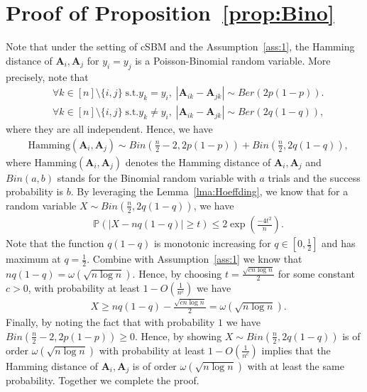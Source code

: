 \documentclass{article} %
\begin{document}
\section{Proof of Proposition~\ref{prop:Bino}}
Note that under the setting of cSBM and the Assumption~\ref{ass:1}, the Hamming distance of $\mathbf{A}_i,\mathbf{A}_j$ for $y_i=y_j$ is a Poisson-Binomial random variable. More precisely, note that
\begin{align}
	& \forall k\in [n]\setminus \{i,j\}\;\text{s.t.}y_k=y_i,\; |\mathbf{A}_{ik}-\mathbf{A}_{jk}| \sim Ber(2p(1-p)).\\
	&  \forall k\in [n]\setminus \{i,j\}\;\text{s.t.}y_k\neq y_i,\; |\mathbf{A}_{ik}-\mathbf{A}_{jk}| \sim Ber(2q(1-q)),
\end{align}
where they are all independent. Hence, we have
\begin{align}
	& \text{Hamming}(\mathbf{A}_i,\mathbf{A}_j) \sim Bin(\frac{n}{2}-2,2p(1-p)) + Bin(\frac{n}{2},2q(1-q)),
\end{align}
where $\text{Hamming}(\mathbf{A}_i,\mathbf{A}_j)$ denotes the Hamming distance of $\mathbf{A}_i,\mathbf{A}_j$ and $Bin(a,b)$ stands for the Binomial random variable with $a$ trials and the success probability is $b$. By leveraging the Lemma~\ref{lma:Hoeffding}, we know that for a random variable $X\sim Bin(\frac{n}{2},2q(1-q))$, we have
\begin{align}
	& \mathbb{P}\left(|X - nq(1-q)|\geq t\right) \leq 2 \exp(\frac{-4t^2}{n}).
\end{align}
 Note that the function $q(1-q)$ is monotonic increasing for $q\in[0,\frac{1}{2}]$ and has maximum at $q=\frac{1}{2}$. Combine with Assumption~\ref{ass:1} we know that $nq(1-q) = \omega(\sqrt{n\log n})$. Hence, by choosing $t = \frac{\sqrt{c n \log n}}{2}$ for some constant $c>0$, with probability at least $1-O(\frac{1}{n^c})$ we have
 \begin{align}
	& X \geq nq(1-q)-\frac{\sqrt{c n \log n}}{2} = \omega(\sqrt{n\log n}).
\end{align}
Finally, by noting the fact that with probability $1$ we have $Bin(\frac{n}{2}-2,2p(1-p))\geq 0$. Hence, by showing $X\sim Bin(\frac{n}{2},2q(1-q))$ is of order $\omega(\sqrt{n\log n})$ with probability at least $1-O(\frac{1}{n^c})$ implies that the Hamming distance of $\mathbf{A}_i,\mathbf{A}_j$ is of order $\omega(\sqrt{n\log n})$ with at least the same probability. Together we complete the proof.
 
\end{document}
